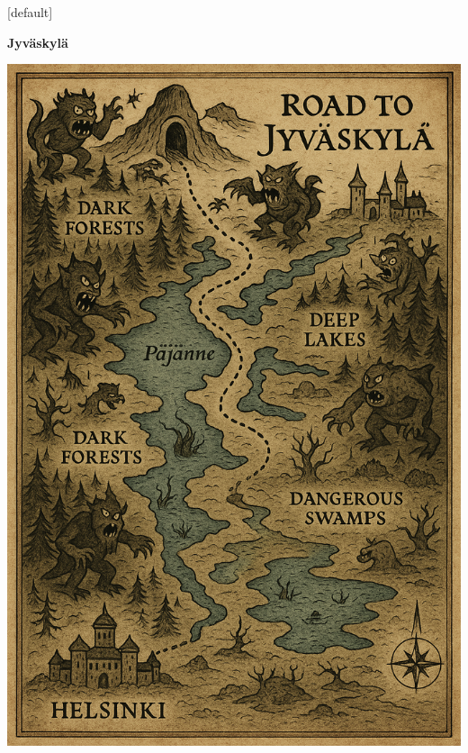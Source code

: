 \documentclass[12pt,aspectratio=169]{beamer}
\begin{document}

[default]
\begin{frame}
  \begin{minipage}{0.58\textwidth}
    \centering
    \huge \textbf{Jyväskylä}
  \end{minipage}
  \begin{minipage}{0.4\textwidth}
    \centering
    \vfill
    \includegraphics[height=1\paperheight]{images/hel-jkl.png}
    \vfill
  \end{minipage}
\end{frame}

\end{document}
